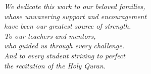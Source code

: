 \thispagestyle{empty}
\vspace*{\fill}
\begin{center}
{\large\itshape\color{black}
We dedicate this work to our beloved families,\\
whose unwavering support and encouragement\\
have been our greatest source of strength.\\[12pt]
To our teachers and mentors,\\
who guided us through every challenge.\\[12pt]
And to every student striving to perfect\\
the recitation of the Holy Quran.
}
\end{center}
\vspace*{\fill}
\newpage
